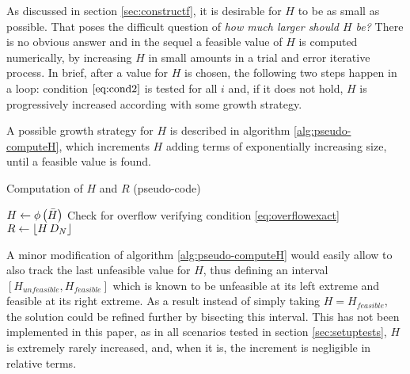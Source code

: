 \documentclass[preprint,1p,times]{elsarticle}
\begin{document}
As discussed in section \ref{sec:constructf}, it is desirable for $H$ to be as small as possible. That poses the difficult question of \textit{how much larger should $H$ be?} There is no obvious answer and in the sequel a feasible value of $H$ is computed numerically, by increasing $H$ in small amounts in a trial and error iterative process. In brief, after a value for $H$ is chosen, the following two steps happen in a loop: condition $\eqref{eq:cond2}$ is tested for all $i$ and, if it does not hold, $H$ is progressively increased according with some growth strategy. 

A possible growth strategy for $H$ is described in algorithm \ref{alg:pseudo-computeH}, which increments $H$ adding terms of exponentially increasing size, until a feasible value is found. 
\begin{algorithm}[h]
	\caption{Computation of $H$ and $R$ (pseudo-code)}
	\label{alg:pseudo-computeH}
	\begin{algorithmic}
			\State	$H \leftarrow \phi\left(\bar{H}\right)$ 
			 
			\EndIf
	     	 
					 
				\EndIf
				 
					 
					 \Comment Check for overflow verifying condition \eqref{eq:overflowexact}
					\EndIf 
					 
				\EndWhile
			\EndFor
			\State $R \leftarrow \left \lfloor H\, D_N \right \rfloor$ 
		\EndFunction
	\end{algorithmic}
\end{algorithm}

A minor modification of algorithm \ref{alg:pseudo-computeH} would easily allow to also track the last unfeasible value for $H$, thus defining an interval $[H_{unfeasible},H_{feasible}]$ which is known to be unfeasible at its left extreme and feasible at its right extreme. As a result instead of simply taking $H=H_{feasible}$, the solution could be refined further by bisecting this interval. This has not been implemented in this paper, as in all scenarios tested in section \ref{sec:setuptests}, $H$ is extremely rarely increased, and, when it is, the increment is negligible in relative terms.
\end{document}
